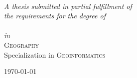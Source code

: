 \documentclass[
11pt, %
oneside, %
english, %
onehalfspacing, %
nolistspacing, %
liststotoc, %
parskip, %
headsepline, %
]{MastersDoctoralThesis} %
\begin{document}
\begin{titlepage}
\begin{center}
\begin{minipage}[t]{.4\textwidth}
\begin{flushright}
\end{flushright}
\end{minipage}\\
 
\vspace{1.6cm}

\large \emph{A thesis submitted in partial fulfillment of\\ the requirements for the degree of}\\[.4cm] %
{\color{hd-red}
    \textsc{\degreename
}}\\[.33cm]
\emph{in}\\[.33cm]
{\color{hd-red}
    \textsc{Geography}\\
    Specialization in \textsc{Geoinformatics}
}\\ %
 
\vfill

{\large \today} %
 
\end{center}
\end{titlepage}


\end{document}
